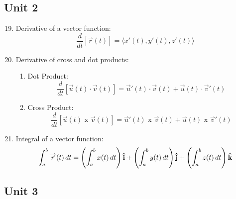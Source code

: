 \documentclass[12pt]{article}
\begin{document}
\subsection{Unit 2}

\begin{enumerate}
    \setcounter{enumi}{18}

  \item Derivative of a vector function:
    $$\frac{d}{dt}[\overrightarrow{r}(t)]=\langle x'(t), y'(t), z'(t)\rangle$$

  \item Derivative of cross and dot products:

    \begin{enumerate}

      \item Dot Product:
        $$\frac{d}{dt}[\overrightarrow{u}(t)\cdot\overrightarrow{v}(t)]=\overrightarrow{u}'(t)\cdot\overrightarrow{v}(t)+\overrightarrow{u}(t)\cdot\overrightarrow{v}'(t)$$

      \item Cross Product:
        $$\frac{d}{dt}[\overrightarrow{u}(t)\text{ x }\overrightarrow{v}(t)]=\overrightarrow{u}'(t)\text{ x }\overrightarrow{v}(t)+\overrightarrow{u}(t)\text{ x }\overrightarrow{v}'(t)$$

    \end{enumerate}

  \item Integral of a vector function:
    $$\int_a^b \overrightarrow{r}(t)\,dt=\left(\int_a^b x(t)\,dt\right)\bold{\hat{i}}+\left(\int_a^by(t)\,dt\right)\bold{\hat{j}}+\left(\int_a^bz(t)\,dt\right)\bold{\hat{k}}$$
\end{enumerate}

\subsection{Unit 3}
\end{document}
